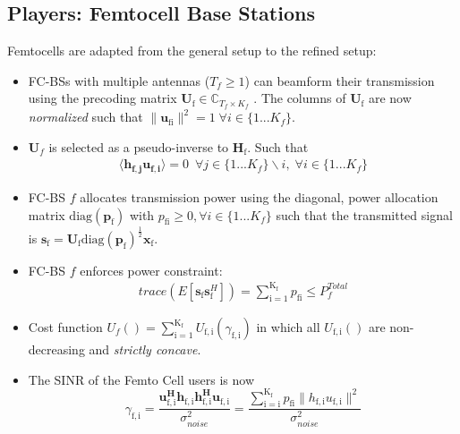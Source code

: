 \documentclass[12pt,a4paper]{report}
\begin{document}
\subsection{Players: Femtocell Base Stations}
Femtocells are adapted from the general setup to the refined setup:
\begin{itemize}
\item 
	FC-BSs with multiple antennas ($T_f \geq 1$) can beamform their transmission using the precoding 	
	matrix $\mathbf{U}_{\mathrm{f}} \in \mathbb{C}_{T_f \times K_f}$ .
	The columns of $\mathbf{U}_{\mathrm{f}}$ are now \emph{normalized} such that 
	 $\|\mathbf{u}_{\mathrm{fi}}\|^2 =1 \;\forall i \in \{1 ... K_f\}$.
\\

\item 
$\mathbf{U}_f$ is selected as a pseudo-inverse to $\mathbf{H_\mathrm{f}}$.
Such that
\begin{gather*}
\langle \mathbf{h_{f,j}}\mathbf{u_{f,i}} \rangle =0\  \; \forall j \in \{1... K_f\}\backslash i ,\; \forall i \in \{1 ... K_f\}
\end{gather*}

\item  
	FC-BS $f$ allocates  transmission power using the diagonal, power allocation  	
	matrix $\mathrm{diag}(\mathbf{p}_{\mathrm{f}})$ with $p_{\mathrm{fi}} \geq 0, \forall i \in \{1 ... K_f\}$
such that the transmitted 		
	signal is 
	$\mathbf{s}_{\mathrm{f}	}= \mathbf{U_{\mathrm{f}}} 
	\mathrm{diag}(\mathbf{p}_{\mathrm{f}})^{\frac{1}{2}}
	\mathbf{x_{\mathrm{f}}}$.
\\
\item 
	FC-BS $f$ enforces power constraint:
	\begin{gather*}
	trace(E[\mathbf{s}_\mathrm{f}\mathbf{s}_\mathrm{f}^H]) =
	\sum_{\mathrm{i=1}}^{\mathrm{K_{\mathrm{f}}}} p_{\mathrm{fi}}
	  \leq P^{Total}_{f} 
	  	\end{gather*}



\item 
	Cost function $U_f() =
	\sum_{\mathrm{i=1}}^{\mathrm{K_f}}
    	U_{\mathrm{f,i}}(\gamma_{\mathrm{f,i}}) $
    	in which all $U_{\mathrm{f,i}}()$ are non-decreasing and
    	\emph{strictly concave}.
\item The SINR of the Femto Cell users is now
\begin{equation}\label{zf_snr}
	\gamma_{\mathrm{f,i}} = 	\frac{\mathbf{u^H_{\mathrm{f,i}}h_{\mathrm{f,i}}h^H_{\mathrm{f,i}}u_{\mathrm{f,i}}}}
	{\sigma^2_{noise}  
	}=\frac{\sum_{\mathrm{i=i}}^{\mathrm{K_{f}}}
 p_{\mathrm{fi}}\|h_{\mathrm{f,i}}u_{\mathrm{f,i}}\|^2}
	{\sigma^2_{noise}  
	}
	\end{equation}

\end{itemize}
\end{document}
